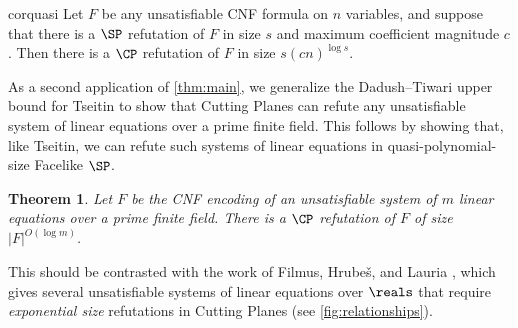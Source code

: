 \documentclass[11pt]{article}
\newtheorem{theorem}{Theorem}[section]
\begin{document}
\begin{restatable}{cor}{quasi}
	\label{cor:quasipoly-simulation}
	Let $F$ be any unsatisfiable CNF formula on $n$ variables, and suppose that there is a $\SP$ refutation of $F$ in size $s$ and maximum coefficient magnitude $c$. 
	Then there is a $\CP$ refutation of $F$ in size $s(cn)^{\log s}$.
\end{restatable}


As a second application of \autoref{thm:main}, we generalize %
the Dadush--Tiwari  %
%
upper bound for Tseitin to show that Cutting Planes can refute any unsatisfiable system of linear equations over a prime finite field. 
This follows by showing that, like Tseitin, we can refute such systems of linear equations in quasi-polynomial-size Facelike $\SP$.
\begin{theorem}\label{thm:linear-equations}
	Let $F$ be the CNF encoding of an unsatisfiable system of $m$ linear equations over a prime finite field. 
	There is a $\CP$ refutation of $F$ of size $|F|^{O(\log m)}$. 
\end{theorem}

This should be contrasted with the work of Filmus, Hrube\v{s}, and Lauria \cite{FilmusHL16}, which gives several unsatisfiable systems of linear equations over $\reals$ that require \emph{exponential size} refutations in Cutting Planes (see \autoref{fig:relationships}).
\end{document}
